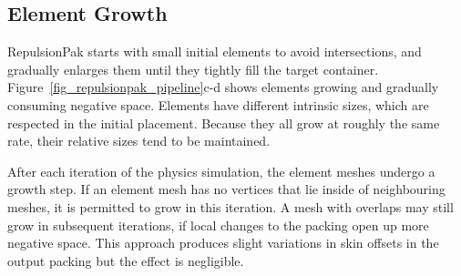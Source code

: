 

\subsection{Element Growth}
\label{repulsionpak_element_growth}

RepulsionPak starts with small initial elements to avoid intersections,
and gradually enlarges them until they tightly fill the target
container.  Figure~\ref{fig_repulsionpak_pipeline}c-d shows elements growing and gradually
consuming negative space.  Elements have different intrinsic sizes, which are
respected in the initial placement.  Because they all grow at roughly the
same rate, their relative sizes tend to be maintained.

After each iteration of the physics simulation, the element meshes undergo
a growth step.  If an element mesh has no vertices that lie inside of
neighbouring meshes, it is permitted to grow in this iteration.  A mesh with
overlaps may still grow in subsequent iterations, if local changes to the 
packing open up more negative space.
This approach produces slight variations in skin offsets in the output packing
but the effect is negligible.

